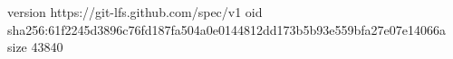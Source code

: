 version https://git-lfs.github.com/spec/v1
oid sha256:61f2245d3896c76fd187fa504a0e0144812dd173b5b93e559bfa27e07e14066a
size 43840
